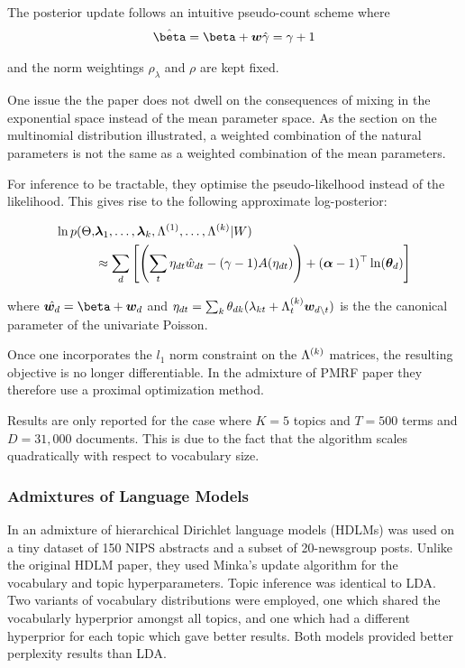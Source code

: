 The posterior update follows an intuitive pseudo-count scheme where
\begin{align}
\hat{\vv{\beta}} = \vv{\beta} + \vv{w}
\hat{\gamma}     = \gamma + 1
\end{align}

and the norm weightings $\rho_\lambda$ and $\rho$ are kept fixed.

One issue the the paper does not dwell on the consequences of mixing in the exponential space instead of the mean parameter space. As the section on the multinomial distribution illustrated, a weighted combination of the natural parameters is not the same as a weighted combination of the mean parameters.

For inference to be tractable, they optimise the pseudo-likelhood instead of the likelihood. This gives rise to the following approximate log-posterior:

\begin{align}
\begin{split}
\ln p(\Theta, & \bm \lambda_1, \ldots, \bm \lambda_k, \Lambda^{(1)}, \ldots, \Lambda^{(k)} | W) \\
& \approx \sum_d \left[ \left( \sum_t \eta_{dt} \hat{w}_{dt} - (\gamma - 1)A(\eta_{dt}) \right) + (\bm \alpha - 1)^\top\ln({ \bm \theta_d }) \right]
\end{split}
\end{align}

where $\hat{\wdoc} = \vv{\beta} + \wdoc$ and $\eta_{dt} = \sum_k { \theta_{dk} } (\lambda_{kt} + \Lambda^{(k)}_t \bm w_{d \setminus t})$ is the the canonical parameter of the univariate Poisson.


Once one incorporates the $l_1$ norm constraint on the $\Lambda^{(k)}$ matrices, the resulting objective is no longer differentiable. In the admixture of PMRF paper they therefore use a proximal optimization method.


Results are only reported for the case where $K=5$ topics and $T=500$ terms and $D=31,000$ documents. This is due to the fact that the algorithm scales quadratically with respect to vocabulary size. 



\subsubsection{Admixtures of Language Models}
In \cite{Wallach2006} an admixture of hierarchical Dirichlet language models (HDLMs)\cite{MacKay1995} was used on a tiny dataset of 150 NIPS abstracts and a subset of 20-newsgroup posts. Unlike the original HDLM paper, they used Minka's update algorithm\cite{Minka2002} for the vocabulary and topic hyperparameters. Topic inference was identical to LDA. Two variants of vocabulary distributions were employed, one which shared the vocabularly hyperprior amongst all topics, and one which had a different hyperprior for each topic which gave better results. Both models provided better perplexity results than LDA.

